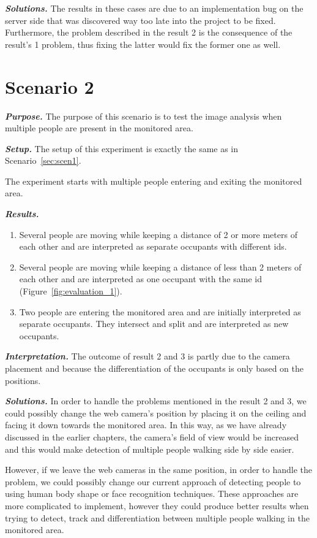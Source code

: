 \textit{\textbf{Solutions.}} The results in these cases are due to an implementation bug on the server side that was discovered way too late into the project to be fixed. Furthermore, the problem described in the result 2 is the consequence of the result's 1 problem, thus fixing the latter would fix the former one as well.

\section{Scenario 2}
\textit{\textbf{Purpose.}} The purpose of this scenario is to test the image analysis when multiple people are present in the monitored area.

\textit{\textbf{Setup.}} The setup of this experiment is exactly the same as in Scenario~\ref{sec:scen1}.

The experiment starts with multiple people entering and exiting the monitored area.

\textit{\textbf{Results.}}
\begin{enumerate}
\item Several people are moving while keeping a distance of 2 or more meters of each other and are interpreted as separate occupants with different ids.
\item Several people are moving while keeping a distance of less than 2 meters of each other and are interpreted as one occupant with the same id (Figure~\ref{fig:evaluation_1}).
\item Two people are entering the monitored area and are initially interpreted as separate occupants. They intersect and split and are interpreted as new occupants.
\end{enumerate}

\textit{\textbf{Interpretation.}} The outcome of result 2 and 3 is partly due to the camera placement and because the differentiation of the occupants is only based on the positions. 

\textit{\textbf{Solutions.}} In order to handle the problems mentioned in the result 2 and 3, we could possibly change the web camera's position by placing it on the ceiling and facing it down towards the monitored area. In this way, as we have already discussed in the earlier chapters, the camera's field of view would be increased and this would make detection of multiple people walking side by side easier.

However, if we leave the web cameras in the same position, in order to handle the problem, we could possibly change our current approach of detecting people to using human body shape or face recognition techniques. These approaches are more complicated to implement, however they could produce better results when trying to detect, track and differentiation between multiple people walking in the monitored area.

